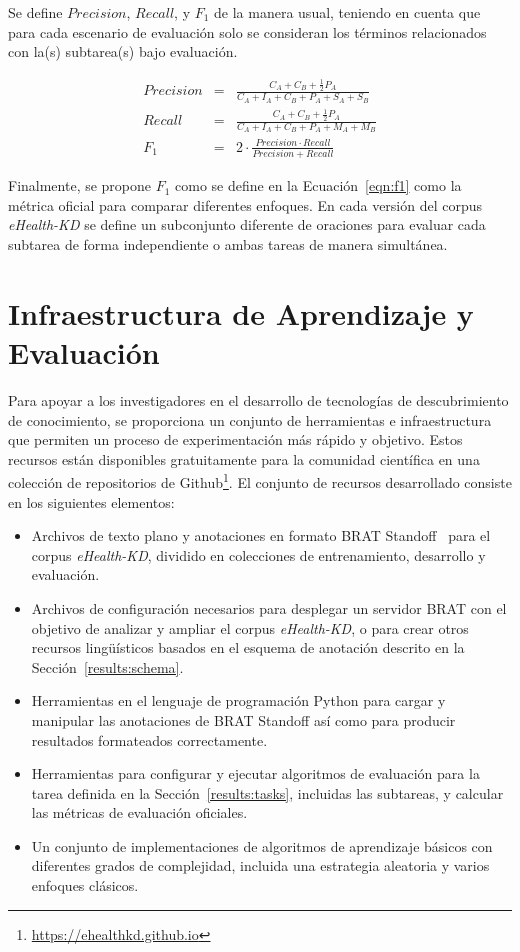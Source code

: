 Se define $Precision$, $Recall$, y $F_1$ de la manera usual, teniendo en cuenta que para cada escenario de evaluación solo se consideran los términos relacionados con la(s) subtarea(s) bajo evaluación.

\begin{eqnarray}
Precision & = & \frac{C_A + C_B + \frac{1}{2} P_A}{C_A + I_A + C_B + P_A + S_A + S_B} \\
Recall    & = & \frac{C_A + C_B + \frac{1}{2} P_A}{C_A + I_A + C_B + P_A + M_A + M_B} \\
F_1       & = & 2 \cdot \frac{Precision \cdot Recall}{Precision + Recall} \label{eqn:f1}
\end{eqnarray}{}

Finalmente, se propone $F_1$ como se define en la Ecuación~\ref{eqn:f1} como la métrica oficial para comparar diferentes enfoques. En cada versión del corpus \textit{eHealth-KD} se define un subconjunto diferente de oraciones para evaluar cada subtarea de forma independiente o ambas tareas de manera simultánea.

\section{Infraestructura de Aprendizaje y Evaluación}\label{results:infrastructure}

Para apoyar a los investigadores en el desarrollo de tecnologías de descubrimiento de conocimiento, se proporciona un conjunto de herramientas e infraestructura que permiten un proceso de experimentación más rápido y objetivo.
Estos recursos están disponibles gratuitamente para la comunidad científica en una colección de repositorios de Github\footnote{\url{https://ehealthkd.github.io}}.
El conjunto de recursos desarrollado consiste en los siguientes elementos:

\begin{itemize}
\item Archivos de texto plano y anotaciones en formato BRAT Standoff~\cite{brat} para el corpus \textit{eHealth-KD}, dividido en colecciones de entrenamiento, desarrollo y evaluación.
\item Archivos de configuración necesarios para desplegar un servidor BRAT con el objetivo de analizar y ampliar el corpus \textit{eHealth-KD}, o para crear otros recursos lingüísticos basados en el esquema de anotación descrito en la Sección~\ref{results:schema}.
\item Herramientas en el lenguaje de programación Python para cargar y manipular las anotaciones de BRAT Standoff así como para producir resultados formateados correctamente.
\item Herramientas para configurar y ejecutar algoritmos de evaluación para la tarea definida en la Sección~\ref{results:tasks}, incluidas las subtareas, y calcular las métricas de evaluación oficiales.
\item Un conjunto de implementaciones de algoritmos de aprendizaje básicos con diferentes grados de complejidad, incluida una estrategia aleatoria y varios enfoques clásicos.
\end{itemize}


